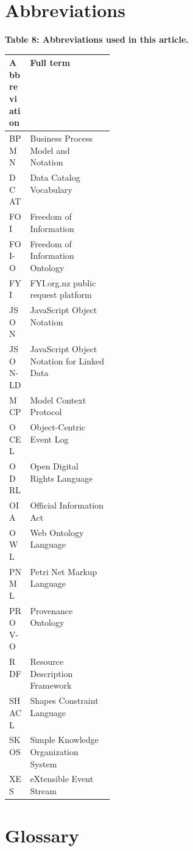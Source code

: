 \documentclass[
]{article}
\begin{document}
\clearpage

\section{Abbreviations}\label{abbreviations}

\begin{table}[H]
\small
\hypertarget{tab-abbreviations}{}
\begin{center}\small\textbf{Table 8: Abbreviations used in this article.}\end{center}
\begin{tabularx}{\linewidth}{>{\raggedright\arraybackslash}p{0.20\linewidth}X}
\toprule
Abbreviation & Full term \\
\midrule
BPMN & Business Process Model and Notation \\
DCAT & Data Catalog Vocabulary \\
FOI & Freedom of Information \\
FOI-O & Freedom of Information Ontology \\
FYI & FYI.org.nz public request platform \\
JSON & JavaScript Object Notation \\
JSON-LD & JavaScript Object Notation for Linked Data \\
MCP & Model Context Protocol \\
OCEL & Object-Centric Event Log \\
ODRL & Open Digital Rights Language \\
OIA & Official Information Act \\
OWL & Web Ontology Language \\
PNML & Petri Net Markup Language \\
PROV-O & Provenance Ontology \\
RDF & Resource Description Framework \\
SHACL & Shapes Constraint Language \\
SKOS & Simple Knowledge Organization System \\
XES & eXtensible Event Stream \\
\bottomrule
\end{tabularx}
\end{table}

\clearpage

\section{Glossary}\label{glossary}
\end{document}
